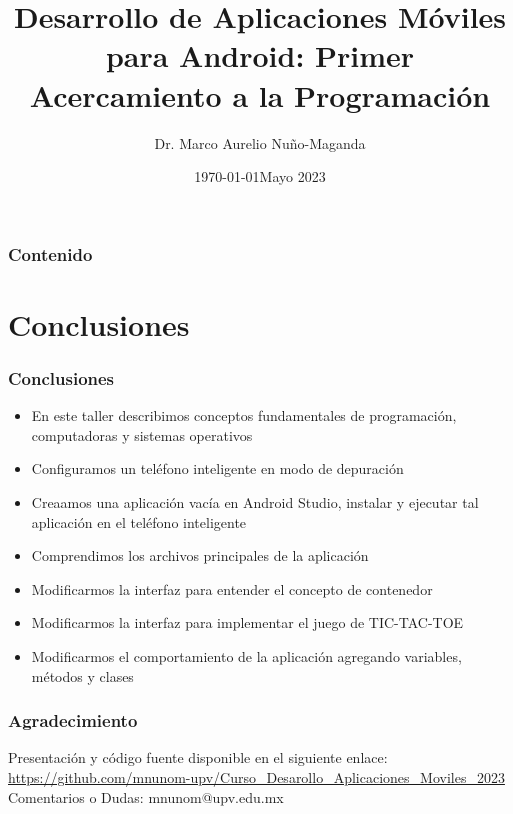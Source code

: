 \documentclass[pdf,
serif,
compress,
xcolor=table,
dvipsnames,
spanish,
aspectratio=169]{beamer}
\date{\specialdate\today}
\title{Desarrollo de Aplicaciones M\'oviles para Android: Primer Acercamiento a la Programaci\'on}
\author[Dr. Marco Aurelio Nuño-Maganda]{Dr. Marco Aurelio Nuño-Maganda}
\institute[UPV]{Universidad Politecnica de Victoria}
\date[]{Mayo 2023}
\begin{document}
\begin{frame}[plain]
  \titlepage
\end{frame}

\begin{frame}
\frametitle{Contenido}  
  \tableofcontents
\end{frame}








\section{Conclusiones} 
\begin{frame}
\frametitle{Conclusiones}  
\begin{itemize}
\item En este taller describimos conceptos fundamentales de programaci\'on, computadoras y sistemas operativos
\item Configuramos un tel\'efono inteligente en modo de depuraci\'on
\item Creaamos una aplicaci\'on vac\'ia en Android Studio, instalar y ejecutar tal aplicaci\'on en el tel\'efono inteligente
\item Comprendimos los archivos principales de la aplicaci\'on
\item Modificarmos la interfaz para entender el concepto de contenedor
\item Modificarmos la interfaz para implementar el juego de TIC-TAC-TOE
\item Modificarmos el comportamiento de la aplicaci\'on agregando variables, m\'etodos y clases 
\end{itemize}
\end{frame}

\begin{frame}
\frametitle{Agradecimiento}  
Presentaci\'on y c\'odigo fuente disponible en el siguiente enlace:\\
\url{https://github.com/mnunom-upv/Curso_Desarollo_Aplicaciones_Moviles_2023}\\
Comentarios o Dudas: mnunom@upv.edu.mx
\end{frame}
\end{document}
